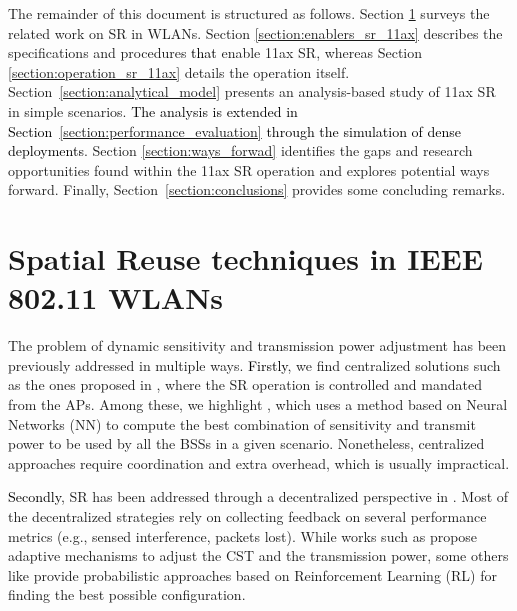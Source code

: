 \documentclass{ieeeaccess}
\begin{document}
The remainder of this document is structured as follows. Section \ref{section:previous_work_sr} surveys the related work on SR in WLANs. Section \ref{section:enablers_sr_11ax} describes the specifications and procedures \textcolor{black}{that} enable 11ax SR, whereas Section \ref{section:operation_sr_11ax} details the operation itself. Section~\ref{section:analytical_model} presents an analysis-based study of 11ax SR in simple scenarios. \textcolor{black}{The analysis is extended in Section~\ref{section:performance_evaluation} through the simulation of dense deployments}. Section \ref{section:ways_forwad} identifies the gaps and research opportunities found within the 11ax SR operation and explores potential ways forward. Finally, Section~\ref{section:conclusions} provides some concluding remarks.

\section{Spatial Reuse techniques in IEEE 802.11 WLANs}%
\label{section:previous_work_sr}
 
The problem of dynamic sensitivity and transmission power adjustment has been previously addressed in multiple ways. \textcolor{black}{Firstly}, we find centralized solutions such as the ones proposed in \cite{li2011achieving, jamil2016novel, nakahira2014centralized}, where the SR operation is controlled and mandated from the APs. Among these, we highlight \cite{jamil2016novel}, which uses a method based on Neural Networks (NN) to compute the best combination of sensitivity and transmit power to be used by all the BSSs in a given scenario. Nonetheless, centralized approaches require coordination and extra overhead, which is usually impractical.

\textcolor{black}{Secondly}, SR has been addressed through a decentralized perspective in \cite{chevillat2005dynamic, tang2011improving, chau2017effective, wilhelmi2019collaborative, wilhelmi2019potential}. Most of the decentralized strategies rely on collecting feedback on several performance metrics (e.g., sensed interference, packets lost). While works such as \cite{chevillat2005dynamic, tang2011improving, chau2017effective} propose adaptive mechanisms to adjust the CST and the transmission power, some others like \cite{wilhelmi2019collaborative, wilhelmi2019potential} provide probabilistic approaches based on Reinforcement Learning (RL) for finding the best possible configuration. 
\end{document}
